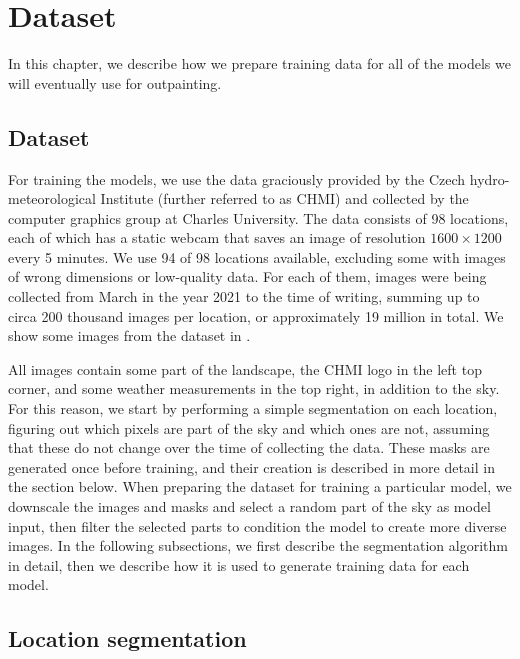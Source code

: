 \chapter{Dataset} \label{dataset}


In this chapter, we describe how we prepare training data for all of the models we will eventually use for outpainting.


\section{Dataset}

For training the models, we use the data graciously provided by the Czech hydro-meteorological Institute (further referred to as CHMI) \citep{chmi_cz_web} and collected by the computer graphics group \citep{computer_graphics_group_web} at Charles University. The data consists of 98 locations, each of which has a static webcam that saves an image of resolution $1600 \times 1200$ every 5 minutes. We use 94 of 98 locations available, excluding some with images of wrong dimensions or low-quality data. For each of them, images were being collected from March in the year 2021 to the time of writing, summing up to circa 200 thousand images per location, or approximately 19 million in total. We show some images from the dataset in .



All images contain some part of the landscape, the CHMI logo in the left top corner, and some weather measurements in the top right, in addition to the sky. For this reason, we start by performing a simple segmentation on each location, figuring out which pixels are part of the sky and which ones are not, assuming that these do not change over the time of collecting the data. These masks are generated once before training, and their creation is described in more detail in the section below. When preparing the dataset for training a particular model, we downscale the images and masks and select a random part of the sky as model input, then filter the selected parts to condition the model to create more diverse images. In the following subsections, we first describe the segmentation algorithm in detail, then we describe how it is used to generate training data for each model.


\section{Location segmentation}

